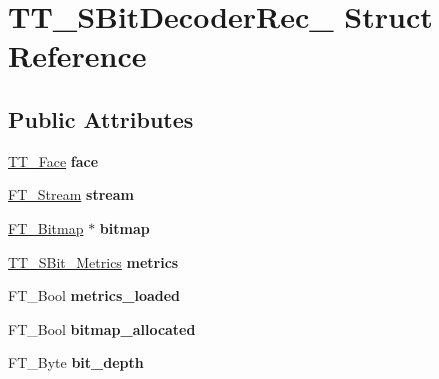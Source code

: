 \hypertarget{struct_t_t___s_bit_decoder_rec__}{}\section{T\+T\+\_\+\+S\+Bit\+Decoder\+Rec\+\_\+ Struct Reference}
\label{struct_t_t___s_bit_decoder_rec__}
\subsection*{Public Attributes}
\begin{DoxyCompactItemize}
\item 
\mbox{\label{struct_t_t___s_bit_decoder_rec___ac2da92ca20a2b5143a023e54aabbc61f}} 
\hyperlink{struct_t_t___face_rec__}{T\+T\+\_\+\+Face} {\bfseries face}
\item 
\mbox{\label{struct_t_t___s_bit_decoder_rec___a64b518960e155ff301fe18948a5ed1fc}} 
\hyperlink{struct_f_t___stream_rec__}{F\+T\+\_\+\+Stream} {\bfseries stream}
\item 
\mbox{\label{struct_t_t___s_bit_decoder_rec___a3fe8ee89ee0e426133926dc53b016ebd}} 
\hyperlink{struct_f_t___bitmap__}{F\+T\+\_\+\+Bitmap} $\ast$ {\bfseries bitmap}
\item 
\mbox{\label{struct_t_t___s_bit_decoder_rec___a5e6c28e15b2b96d38134cdf91732eff4}} 
\hyperlink{struct_t_t___s_bit___metrics_rec__}{T\+T\+\_\+\+S\+Bit\+\_\+\+Metrics} {\bfseries metrics}
\item 
\mbox{\label{struct_t_t___s_bit_decoder_rec___a5a4381780ac2e39e70d2f776da378271}} 
F\+T\+\_\+\+Bool {\bfseries metrics\+\_\+loaded}
\item 
\mbox{\label{struct_t_t___s_bit_decoder_rec___a5be691132df0bd667a42a7f0b60efab9}} 
F\+T\+\_\+\+Bool {\bfseries bitmap\+\_\+allocated}
\item 
\mbox{\label{struct_t_t___s_bit_decoder_rec___acff77ae4ed96bd77c4896fa86893a24d}} 
F\+T\+\_\+\+Byte {\bfseries bit\+\_\+depth}

\end{DoxyCompactItemize}
